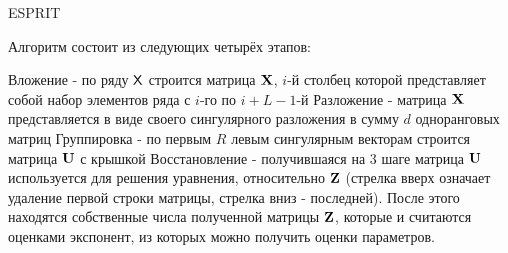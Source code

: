 \documentclass[ucs, notheorems, handout]{beamer}
\begin{document}
\begin{frame}{ESPRIT}
{            Алгоритм состоит из следующих четырёх этапов:
            
            Вложение - по ряду $\mathsf{X}$ строится матрица $\mathbf{X}$, $i$-й столбец которой представляет собой набор элементов ряда с $i$-го по $i+L-1$-й
            Разложение - матрица $\mathbf{X}$ представляется в виде своего сингулярного разложения в сумму $d$ одноранговых матриц
            Группировка - по первым $R$ левым сингулярным векторам строится матрица $\mathbf{U}$ с крышкой
            Восстановление - получившаяся на 3 шаге матрица $\mathbf{U}$ используется для решения уравнения, относительно $\mathbf{Z}$ (стрелка вверх означает удаление первой строки матрицы, стрелка вниз - последней). После этого находятся собственные числа полученной матрицы $\mathbf{Z}$, которые и считаются оценками экспонент, из которых можно получить оценки параметров.
        }
    \end{frame}
    
\end{document}
